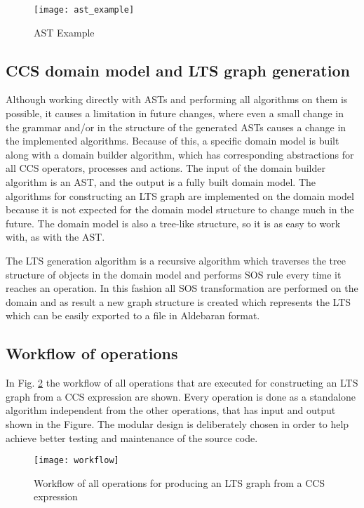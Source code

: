 \begin{figure}[!t]
\centering
\texttt{[image: ast\_example]}
\caption{AST Example}
\label{fig:ast_example}
\end{figure}

\subsection{CCS domain model and LTS graph generation}
Although working directly with ASTs and performing all algorithms on them is possible, it causes 
a limitation in future changes, where even a small change in the grammar and/or in the structure of the
generated ASTs causes a change in the implemented algorithms. Because of this,
a specific domain model is built along with a domain builder algorithm, which has corresponding
abstractions for all CCS operators, processes and actions. The input of the domain builder algorithm 
is an AST, and the output is a fully built domain model. The algorithms for constructing an LTS graph 
are implemented on the domain model because it is not expected for the domain model structure to 
change much in the future. The domain model is also a tree-like structure, so it is as easy to work with, 
as with the AST. 

The LTS generation algorithm is a recursive algorithm which traverses the tree structure of objects 
in the domain model and performs SOS rule every time it reaches an operation.
In this fashion all SOS transformation are performed on the domain and as result a new graph
structure is created which represents the LTS which can be easily exported to a file
in Aldebaran format.

\subsection{Workflow of operations}
In  Fig. \ref{fig:workflow} the workflow of all operations that are executed for constructing an LTS graph from a 
CCS expression are shown. Every operation is done as a standalone algorithm independent from the other operations,
that has input and output shown in the Figure. The modular design is deliberately chosen in order to help achieve better 
testing and maintenance of the source code. 

\begin{figure}[h]
\centering
\texttt{[image: workflow]}
\caption{Workflow of all operations for producing an LTS graph from a CCS expression}
\label{fig:workflow}
\end{figure}
